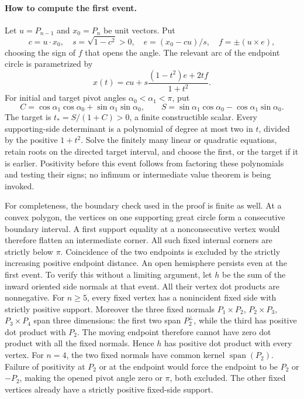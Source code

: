 \paragraph{How to compute the first event.}
Let $u=P_{n-1}$ and $x_0=P_n$ be unit vectors. Put
\[
 c=u\cdot x_0,\quad s=\sqrt{1-c^2}>0,\quad
 e=(x_0-cu)/s,\quad f=\pm(u\times e),
\]
choosing the sign of $f$ that opens the angle. The relevant arc of the
endpoint circle is parametrized by
\begin{equation}\label{eq:circleparam}
 x(t)=cu+s\frac{(1-t^2)e+2tf}{1+t^2}.
\end{equation}
For initial and target pivot angles $\alpha_0<\alpha_1<\pi$, put
\[
 C=\cos\alpha_1\cos\alpha_0+\sin\alpha_1\sin\alpha_0,
 \qquad
 S=\sin\alpha_1\cos\alpha_0-\cos\alpha_1\sin\alpha_0.
\]
The target is $t_*=S/(1+C)>0$, a finite constructible scalar.
Every supporting-side determinant is
a polynomial of degree at most two in $t$, divided by the positive
$1+t^2$. Solve the finitely many linear or quadratic equations,
retain roots on the directed target interval, and choose the first,
or the target if it is earlier. Positivity before this event follows
from factoring these polynomials and testing their signs; no infimum
or intermediate value theorem is being invoked.

For completeness, the boundary check used in the proof is finite as
well. At a convex polygon, the vertices on one supporting great
circle form a consecutive boundary interval. A first support equality
at a nonconsecutive vertex would therefore flatten an intermediate
corner. All such fixed internal corners are strictly below $\pi$.
Coincidence of the two endpoints is excluded by the strictly increasing
positive endpoint distance. An open hemisphere persists even at the
first event. To verify this without a limiting argument, let $h$ be
the sum of the inward oriented side normals at that event. All their
vertex dot products are nonnegative. For $n\geq5$, every fixed vertex
has a nonincident fixed side with strictly positive support. Moreover
the three fixed normals $P_1\times P_2$, $P_2\times P_3$,
$P_3\times P_4$ span three dimensions: the first two span
$P_2^\perp$, while the third has positive dot product with $P_2$.
The moving endpoint therefore cannot have zero dot product with all
the fixed normals. Hence $h$ has positive dot product with every
vertex. For $n=4$, the two fixed normals have common kernel
$\operatorname{span}(P_2)$. Failure of positivity at $P_2$ or at the
endpoint would force the endpoint to be $P_2$ or $-P_2$, making the
opened pivot angle zero or $\pi$, both excluded. The other fixed
vertices already have a strictly positive fixed-side support.

